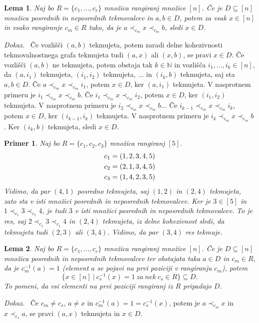 \documentclass[a4paper, 12pt]{book}
\newtheorem{lema}{Lema}[chapter]
\newtheorem{primer}{Primer}[chapter]
\newenvironment{dokaz}{\emph{Dokaz.}\ }{\hspace{\fill}{$\Box$}}
\begin{document}
\begin{lema}
\label{lema_algoritem_posredni_tekmovalci_1}
    Naj bo $R = \{ c_1, ..., c_r \}$ množica rangiranj množice $[n]$. Če je $D \subseteq [n]$ množica posrednih in neposrednih tekmovalcev in $a, b \in D$, potem za vsak $x \in [n]$ in vsako rangiranje $c_m \in R$ tako, da je $a \prec_{c_m} x \prec_{c_m} b$, sledi $x \in D$.
\end{lema}
\begin{dokaz}
    Če vozlišči $(a, b)$ tekmujeta, potem zaradi delne kohezivnosti tekmovalnostnega grafa tekmujeta tudi $(a, x)$ ali $(x, b)$, se pravi $x \in D$. Če vozlišči $(a, b)$ ne tekmujeta, potem obstaja tak $k \in \mathbb{N}$ in vozlišča $i_1, ..., i_k \in [n]$, da $(a, i_1)$ tekmujeta, $(i_1, i_2)$ tekmujeta, ... in $(i_k, b)$ tekmujeta, saj sta $a,b \in D$. Če $a \prec_{c_m} x \prec_{c_m} i_1$, potem $x \in D$, ker $(a, i_1)$ tekmujeta. V nasprotnem primeru je $i_1 \prec_{c_m} x \prec_{c_m} b$. Če $i_1 \prec_{c_m} x \prec_{c_m} i_2$, potem $x \in D$, ker $(i_1, i_2)$ tekmujeta. V nasprotnem primeru je $i_2 \prec_{c_m} x \prec_{c_m} b$... Če $i_{k-1} \prec_{c_m} x \prec_{c_m} i_k$, potem $x \in D$, ker $(i_{k-1}, i_k)$ tekmujeta. V nasprotnem primeru je $i_k \prec_{c_m} x \prec_{c_m} b$. Ker $(i_k, b)$ tekmujeta, sledi $x \in D$.
\end{dokaz}

\begin{primer}
    Naj bo $R = \{ c_1, c_2, c_3\}$ množica rangiranj $[5]$.
    \begin{align}
        c_1 &= (1, 2, 3, 4, 5) \notag\\
        c_2 &= (2, 1, 3, 4, 5) \notag\\
        c_3 &= (1, 4, 2, 3, 5) \notag
    \end{align}
    Vidimo, da par $(4, 1)$ posredno tekmujeta, saj $(1, 2)$ in $(2, 4)$ tekmujeta, zato sta v isti množici posrednih in neposrednih tekmovalcev. Ker je $3 \in [5]$ in $1 \prec_{c_1} 3 \prec_{c_1} 4$, je tudi $3$ v isti množici posrednih in neposrednih tekmovalcev. To je res, saj $2 \prec_{c_1} 3 \prec_{c_1} 4$ in $(2, 4)$ tekmujeta, iz delne kohezivnost sledi, da tekmujeta tudi $(2, 3)$ ali $(3, 4)$. Vidimo, da par $(3, 4)$ res tekmuje.
\end{primer}

\begin{lema}
\label{lema_algoritem_posredni_tekmovalci_2}
    Naj bo $R = \{ c_1, ..., c_r \}$ množica rangiranj množice $[n]$. Če je $D \subseteq [n]$ množica posrednih in neposrednih tekmovalcev ter obstajata taka $a \in D$ in  $c_m \in R$, da je $c_m^{-1}(a) = 1$ (element $a$ se pojavi na prvi poziciji v rangiranju $c_m$), potem 
    \[
        \{ x \in [n] \ | \ c_s^{-1}(x) = 1 \ za \ nek \ c_s \in R \} \subseteq D.    
    \]
    To pomeni, da vsi elementi na prvi poziciji rangiranj iz $R$ pripadajo $D$.
\end{lema}
\begin{dokaz}
    Če $c_m \neq c_s$,  $a \neq x$ in $c_m^{-1}(a) = 1 = c_s^{-1}(x)$, potem je $a \prec_{c_m} x$ in $x \prec_{c_s} a$, se pravi $(a, x)$ tekmujeta in $x \in D$. 
\end{dokaz}
\end{document}
